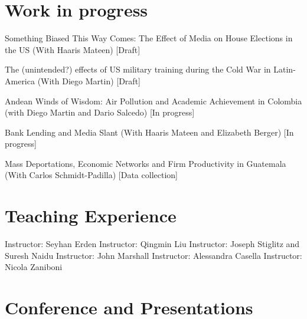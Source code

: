\documentclass{moderncv}
\begin{document}
\section{\textbf{Work in progress}}

{Something Biased This Way Comes: The Effect of Media on House Elections in the US (With Haaris Mateen) [Draft] \\ }

{The (unintended?) effects of US military training during the Cold War in Latin-America (With Diego Martin) [Draft]\\ }

{Andean Winds of Wisdom: Air Pollution and Academic Achievement in Colombia (with Diego Martin and Dario Salcedo) [In progress]\\ }

{Bank Lending and Media Slant (With Haaris Mateen and Elizabeth Berger)  [In progress] \\ }

{Mass Deportations, Economic Networks and Firm Productivity in Guatemala (With Carlos Schmidt-Padilla)  [Data collection] \\ }

\section{\textbf{Teaching Experience}}
 {}{}{Instructor: Seyhan Erden}
 {}{}{Instructor: Qingmin Liu}
 {}{}{Instructor: Joseph Stiglitz and Suresh Naidu}
 {}{}{Instructor: John Marshall}
 {}{}{Instructor: Alessandra Casella}
 {}{}{Instructor: Nicola Zaniboni}

\section{\textbf{Conference and Presentations}}
\end{document}
